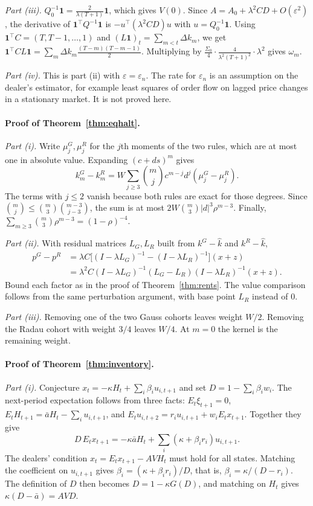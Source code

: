\emph{Part (iii).} $Q_0^{-1}\mathbf1=\frac{2}{\lambda(T+1)}\mathbf1$, which gives $V(0)$. Since $A=A_0+\lambda^2CD+O(\varepsilon^2)$, the derivative of $\mathbf1^\top Q^{-1}\mathbf1$ is $-u^\top(\lambda^2CD)u$ with $u=Q_0^{-1}\mathbf1$. Using $\mathbf1^\top C=(T,T-1,\ldots,1)$ and $(L\mathbf1)_t=\sum_{m<t}\Delta k_m$, we get $\mathbf1^\top CL\mathbf1=\sum_m\Delta k_m\frac{(T-m)(T-m-1)}2$. Multiplying by $\tfrac{\Sigma_0}4\cdot\frac{4}{\lambda^2(T+1)^2}\cdot\lambda^2$ gives $\omega_m$.

\emph{Part (iv).} This is part (ii) with $\varepsilon=\varepsilon_n$. The rate for $\varepsilon_n$ is an assumption on the dealer's estimator, for example least squares of order flow on lagged price changes in a stationary market. It is not proved here.

\paragraph{Proof of Theorem~\ref{thm:eqhalt}.}
\emph{Part (i).} Write $\mu_j^G,\mu_j^R$ for the $j$th moments of the two rules, which are at most one in absolute value. Expanding $(c+ds)^m$ gives
\[
k_m^G-k_m^R=W\sum_{j\ge3}\binom mj c^{m-j}d^j(\mu_j^G-\mu_j^R).
\]
The terms with $j\le2$ vanish because both rules are exact for those degrees. Since $\binom mj\le\binom m3\binom{m-3}{j-3}$, the sum is at most $2W\binom m3|d|^3\rho^{m-3}$. Finally, $\sum_{m\ge3}\binom m3\rho^{m-3}=(1-\rho)^{-4}$.

\emph{Part (ii).} With residual matrices $L_G,L_R$ built from $k^G-\hat k$ and $k^R-\hat k$,
\begin{align*}
p^G-p^R&=\lambda C\bigl[(I-\lambda L_G)^{-1}-(I-\lambda L_R)^{-1}\bigr](x+z)\\
&=\lambda^2C(I-\lambda L_G)^{-1}(L_G-L_R)(I-\lambda L_R)^{-1}(x+z).
\end{align*}
Bound each factor as in the proof of Theorem~\ref{thm:rents}. The value comparison follows from the same perturbation argument, with base point $L_R$ instead of $0$.

\emph{Part (iii).} Removing one of the two Gauss cohorts leaves weight $W/2$. Removing the Radau cohort with weight $3/4$ leaves $W/4$. At $m=0$ the kernel is the remaining weight.


\paragraph{Proof of Theorem~\ref{thm:inventory}.}
\emph{Part (i).} Conjecture $x_t=-\kappa H_t+\sum_i\beta_iu_{i,t+1}$ and set $D=1-\sum_i\beta_iw_i$. The next-period expectation follows from three facts: $E_t\xi_{t+1}=0$, $E_tH_{t+1}=\bar aH_t-\sum_iu_{i,t+1}$, and $E_tu_{i,t+2}=r_iu_{i,t+1}+w_iE_tx_{t+1}$. Together they give
\[
 D\,E_tx_{t+1}=-\kappa\bar aH_t+\sum_i(\kappa+\beta_ir_i)u_{i,t+1}.
\]
The dealers' condition $x_t=E_tx_{t+1}-AVH_t$ must hold for all states. Matching the coefficient on $u_{i,t+1}$ gives $\beta_i=(\kappa+\beta_ir_i)/D$, that is, $\beta_i=\kappa/(D-r_i)$. The definition of $D$ then becomes $D=1-\kappa G(D)$, and matching on $H_t$ gives $\kappa(D-\bar a)=AVD$.

